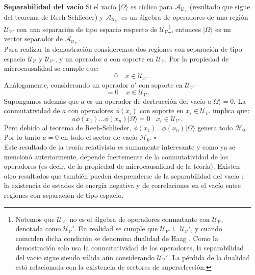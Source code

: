 \textbf{Separabilidad del vacío} Si el vacío $|\Omega \rangle$ es cíclico para $\mathcal{A}_{\mathcal{U}_{\mathcal{V}}}$ (resultado que sigue del teorema de Reeh-Schlieder) y $\mathcal{A}_{\mathcal{U}_{\mathcal{V'}}}$ es un álgebra de operadores de una región $\mathcal{U}_{\mathcal{V'}}$ con una separación de tipo espacio respecto de $\mathcal{U}_{\mathcal{V}}$\footnote{Notemos que $\mathcal{U}_{\mathcal{V'}}$ no es el álgebra de operadores conmutante con $\mathcal{U}_{\mathcal{V}}$, denotada como $\mathcal{U}_{\mathcal{V}}'$. En realidad se cumple que $\mathcal{U}_{\mathcal{V'}}\subseteq  \mathcal{U}_{\mathcal{V}}'$, y cuando coinciden dicha condición se denomina dualidad de Haag \cite{Witten:2018lha}. Como la demostración solo usa la conmutatividad de los operadores, la separabilidad del vacío sigue siendo válida aún considerando $\mathcal{U}_{\mathcal{V}}'$. La pérdida de la dualidad está relacionada con la existencia de sectores de superselección\cite{Casini:2019kex}.}, entonces $|\Omega \rangle$ es un vector separador de $\mathcal{A}_{\mathcal{U}_{\mathcal{V'}}}$.\\

Para realizar la demostración consideremos dos regiones con separación de tipo espacio $\mathcal{U}_{\mathcal{V}}$ y $\mathcal{U}_{\mathcal{V'}}$, y un operador $a$ con soporte en $\mathcal{U}_{\mathcal{V}}$. Por la propiedad de microcausalidad se cumple que:
\begin{equation}
[\phi(x),a]=0\:\:\:\:\: x \in \mathcal{U}_{\mathcal{V'}}.
\end{equation}
Análogamente, considerando un operador $a'$ con soporte en $\mathcal{U}_{\mathcal{V'}}$
\begin{equation}
[\phi(x),a']=0\:\:\:\:\: x \in \mathcal{U}_{\mathcal{V}}.
\end{equation}
Supongamos además que $a$ es un operador de destrucción del vacío $a|\Omega \rangle=0$. La conmutatividad de $a$ con operadores $\phi(x_i)$ con soporte en $x_i\in \mathcal{U}_{\mathcal{V'}}$ implica que:
\begin{equation}
a \phi(x_1) \ldots \phi(x_n)|\Omega \rangle=0\:\:\:\: x_i \in \mathcal{U}_{\mathcal{V'}}.
\end{equation}
Pero debido al teorema de Reeh-Schlieder, $\phi(x_1) \ldots \phi(x_n)|\Omega \rangle$ genera todo $\mathcal{H}_0$. Por lo tanto $a=0$ en todo el sector de vacío $\mathcal{H}_0$. $\square$\\

Este resultado de la teoría relativista es sumamente interesante y como ya se mencionó anteriormente, depende fuertemente de la conmutatividad de los operadores (es decir, de la propiedad de microcausalidad de la teoría). Existen otro resultados que también pueden desprenderse de la separabilidad del vacío \cite{Witten:2018lha}: la existencia de estados de energía negativa y de correlaciones en el vacío entre regiones con separación de tipo espacio.

